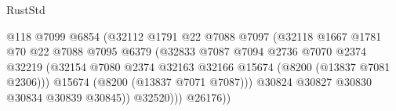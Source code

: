 \begin{lexlean}{RustStd}
\begin{coremodule}
                                                      @118
                                                      @7099
                                                      @6854
                                                      (@32112
                                                        @1791
                                                        @22
                                                        @7088
                                                        @7097
                                                        (@32118
                                                          @1667
                                                          @1781
                                                          @70
                                                          @22
                                                          @7088
                                                          @7095
                                                          @6379
                                                          (@32833
                                                            @7087
                                                            @7094
                                                            @2736
                                                            @7070
                                                            @2374
                                                            @32219
                                                            (@32154
                                                              @7080
                                                              @2374
                                                              @32163
                                                              @32166
                                                              @15674
                                                              (@8200 (@13837 @7081 @2306)))
                                                            @15674
                                                            (@8200 (@13837 @7071 @7087)))
                                                          @30824
                                                          @30827
                                                          @30830
                                                          @30834
                                                          @30839
                                                          @30845))
                                                      @32520)))
                                                @26176))

\end{coremodule}
\end{lexlean}

